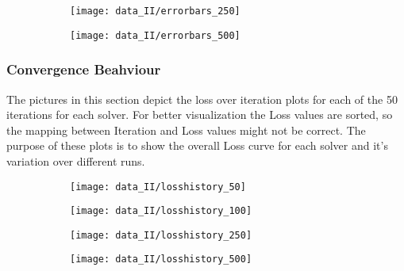 \begin{figure}[h]
	\begin{subfigure}{0.5\textwidth}
		\texttt{[image: data\_II/errorbars\_250]}
		\label{fig:errorbars_250_II}
	\end{subfigure}
	\begin{subfigure}{0.5\textwidth}
		\texttt{[image: data\_II/errorbars\_500]}
		\label{fig:errorbars_500_II}
	\end{subfigure}
\end{figure}


\newpage


\subsubsection{Convergence Beahviour}

The pictures in this section depict the loss over iteration plots for each of the 50 iterations for each solver. For better visualization the Loss values are sorted, so the mapping between Iteration and Loss values might not be correct. The purpose of these plots is to show the overall Loss curve for each solver and it's variation over different runs.  

\begin{figure}[h]
	\begin{subfigure}{0.5\textwidth}
		\texttt{[image: data\_II/losshistory\_50]}
		\label{fig:losshistory_50_II}
	\end{subfigure}
	\begin{subfigure}{0.5\textwidth}
		\texttt{[image: data\_II/losshistory\_100]}
		\label{fig:losshistory_100_II}
	\end{subfigure}
\end{figure}

\begin{figure}[h]
	\begin{subfigure}{0.5\textwidth}
		\texttt{[image: data\_II/losshistory\_250]}
		\label{fig:losshistory_250_II}
	\end{subfigure}
	\begin{subfigure}{0.5\textwidth}
		\texttt{[image: data\_II/losshistory\_500]}
		\label{fig:losshistory_500_II}
	\end{subfigure}
\end{figure}